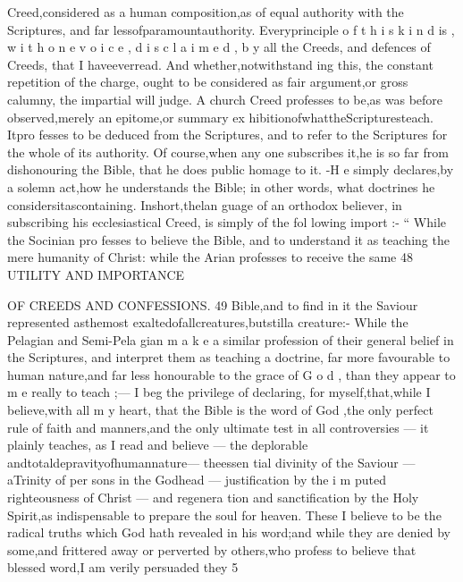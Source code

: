 \documentclass[
]{book}
\begin{document}
Creed,considered as a human composition,as of equal authority with the Scriptures, and far
lessofparamountauthority. Everyprinciple o f t h i s k i n d is , w i t h o n e v o i c e , d i s c l a i m e d , b y
all the Creeds, and defences of Creeds, that I
haveeverread. And whether,notwithstand
ing this, the constant repetition of the charge, ought to be considered as fair argument,or
gross calumny, the impartial will judge. A church Creed professes to be,as was before observed,merely an epitome,or summary ex hibitionofwhattheScripturesteach. Itpro fesses to be deduced from the Scriptures, and
to refer to the Scriptures for the whole of its authority. Of course,when any one subscribes it,he is so far from dishonouring the Bible, that he does public homage to it. -H e simply declares,by a solemn act,how he understands
the Bible; in other words, what doctrines he
considersitascontaining. Inshort,thelan
guage of an orthodox believer, in subscribing
his ecclesiastical Creed, is simply of the fol
lowing import :- `` While the Socinian pro fesses to believe the Bible, and to understand
it as teaching the mere humanity of Christ: while the Arian professes to receive the same
48 UTILITY AND IMPORTANCE

OF CREEDS AND CONFESSIONS. 49
Bible,and to find in it the Saviour represented asthemost exaltedofallcreatures,butstilla creature:- While the Pelagian and Semi-Pela gian m a k e a similar profession of their general belief in the Scriptures, and interpret them as teaching a doctrine, far more favourable to human nature,and far less honourable to the grace of G o d , than they appear to m e really to teach ;--- I beg the privilege of declaring, for
myself,that,while I believe,with all m y heart, that the Bible is the word of God ,the only
perfect rule of faith and manners,and the only ultimate test in all controversies --- it plainly
teaches, as I read and believe --- the deplorable andtotaldepravityofhumannature--- theessen tial divinity of the Saviour --- aTrinity of per sons in the Godhead --- justification by the i m puted righteousness of Christ --- and regenera tion and sanctification by the Holy Spirit,as indispensable to prepare the soul for heaven. These I believe to be the radical truths which God hath revealed in his word;and while they are denied by some,and frittered away
or perverted by others,who profess to believe that blessed word,I am verily persuaded they
5
\end{document}
